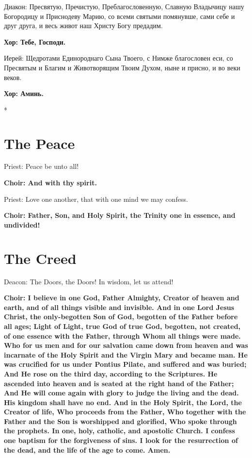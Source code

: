 \documentclass[12pt,a4paper,titlepage]{report}
\begin{document}
\begin{paracol}[1]{2}
  Диакон: Пресвятую, Пречистую, Преблагословенную, Славную Владычицу нашу Богородицу и Приснодеву Марию, со всеми святыми помянувше, сами себе и друг друга, и весь живот наш Христу Богу предадим.

  \textbf{Хор: Тебе, Господи.}

  Иерей: Щедротами Единороднаго Сына Твоего, с Нимже благословен еси, со Пресвятым и Благим и Животворящим Твоим Духом, ныне и присно, и во веки веков.

  \textbf{Хор: Аминь.}

  \switchcolumn[0]*

  \section*{The Peace}

  Priest: Peace be unto all!

  \textbf{Choir: And with thy spirit.}

  Priest: Love one another, that with one mind we may confess.

  \textbf{Choir: Father, Son, and Holy Spirit, the Trinity one in essence, and undivided!}

  \section*{The Creed}

  Deacon: The Doors, the Doors! In wisdom, let us attend!

  \textbf{Choir: I believe in one God, Father Almighty, Creator of heaven and earth, and of all things visible and invisible. And in one Lord Jesus Christ, the only-begotten Son of God, begotten of the Father before all ages; Light of Light, true God of true God, begotten, not created, of one essence with the Father, through Whom all things were made. Who for us men and for our salvation came down from heaven and was incarnate of the Holy Spirit and the Virgin Mary and became man. He was crucified for us under Pontius Pilate, and suffered and was buried; And He rose on the third day, according to the Scriptures. He ascended into heaven and is seated at the right hand of the Father; And He will come again with glory to judge the living and the dead. His kingdom shall have no end. And in the Holy Spirit, the Lord, the Creator of life, Who proceeds from the Father, Who together with the Father and the Son is worshipped and glorified, Who spoke through the prophets. In one, holy, catholic, and apostolic Church. I confess one baptism for the forgiveness of sins. I look for the resurrection of the dead, and the life of the age to come. Amen.}


\end{paracol}
\end{document}
